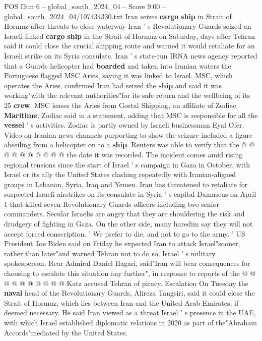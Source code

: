 \begin{textsample}{POS Dim 6 – global\_south\_2024\_04 – Score 9.00 – global\_south\_2024\_04/107434330.txt}  \label{ex:f6_pos_121}
Iran seizes \textbf{cargo} \textbf{ship} in Strait of Hormuz after threats to close waterway Iran ' s Revolutionary Guards seized an Israeli-linked \textbf{cargo} \textbf{ship} in the Strait of Hormuz on Saturday, days after Tehran said it could close the crucial shipping route and warned it would retaliate for an Israeli strike on its Syria consulate.
Iran ' s state-run IRNA news agency reported that a Guards helicopter had \textbf{boarded} and taken into Iranian waters the Portuguese flagged MSC Aries, saying it was linked to Israel.
MSC, which operates the Aries, confirmed Iran had seized the \textbf{ship} and said it was working"with the relevant authorities"for its safe return and the wellbeing of its 25 \textbf{crew}.
MSC leases the Aries from Gortal Shipping, an affiliate of Zodiac \textbf{Maritime}, Zodiac said in a statement, adding that MSC is responsible for all the \textbf{vessel} ' s activities.
Zodiac is partly owned by Israeli businessman Eyal Ofer.
Video on Iranian news channels purporting to show the seizure included a figure abseiling from a helicopter on to a \textbf{ship}.
Reuters was able to verify that the @ @ @ @ @ @ @ @ @ @ the date it was recorded.
The incident comes amid rising regional tensions since the start of Israel ' s campaign in Gaza in October, with Israel or its ally the United States clashing repeatedly with Iranian-aligned groups in Lebanon, Syria, Iraq and Yemen.
Iran has threatened to retaliate for suspected Israeli airstrikes on its consulate in Syria ' s capital Damascus on April 1 that killed seven Revolutionary Guards officers including two senior commanders.
Secular Israelis are angry that they are shouldering the risk and drudgery of fighting in Gaza.
On the other side, many haredim say they will not accept forced conscription. ' We prefer to die, and not to go to the army. ' US President Joe Biden said on Friday he expected Iran to attack Israel"sooner, rather than later"and warned Tehran not to do so.
Israel ' s military spokesperson, Rear Admiral Daniel Hagari, said"Iran will bear consequences for choosing to escalate this situation any further", in response to reports of the @ @ @ @ @ @ @ @ @ @ Katz accused Tehran of piracy.
Escalation On Tuesday the \textbf{naval} head of the Revolutionary Guards, Alireza Tangsiri, said it could close the Strait of Hormuz, which lies between Iran and the United Arab Emirates, if deemed necessary.
He said Iran viewed as a threat Israel ' s presence in the UAE, with which Israel established diplomatic relations in 2020 as part of the"Abraham Accords"mediated by the United States.

\end{textsample}
